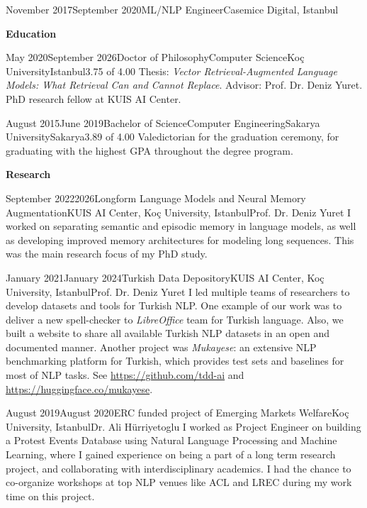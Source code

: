 \documentclass{cv}
\begin{document}
\begin{employment}{November 2017}{September 2020}{ML/NLP Engineer}{Casemice Digital, Istanbul}
\end{employment}
	

	\textbf{Education}\\
	\begin{education}{May 2020}{September 2026}{Doctor of Philosophy}{Computer Science}{Koç University}{Istanbul}{3.75 of 4.00}
	    Thesis: \textit{Vector Retrieval-Augmented Language Models: What Retrieval Can and Cannot Replace}. Advisor: Prof. Dr. Deniz Yuret. PhD research fellow at KUIS AI Center.
	\end{education}
	\vspace{0.1in}

	\begin{education}{August 2015}{June 2019}{Bachelor of Science}{Computer Engineering}{Sakarya University}{Sakarya}{3.89 of 4.00}
        Valedictorian for the graduation ceremony, for graduating with the highest GPA throughout the degree program.
	\end{education}
	
	\textbf{Research}\\
		\begin{research_exp}{September 2022}{2026}{Longform Language Models and Neural Memory Augmentation}{KUIS AI Center, Koç University, Istanbul}{Prof. Dr. Deniz Yuret}
            I worked on separating semantic and episodic memory in language models, as well as developing improved memory architectures for modeling long sequences. This was the main research focus of my PhD study.
	    \end{research_exp}
		\begin{research_exp}{January 2021}{January 2024}{Turkish Data Depository}{KUIS AI Center, Koç University, Istanbul}{Prof. Dr. Deniz Yuret}
            I led multiple teams of researchers to develop datasets and tools for Turkish NLP. One example of our work was to deliver a new spell-checker to \textit{LibreOffice} team for Turkish language. Also, we built a website to share all available Turkish NLP datasets in an open and documented manner. Another project was \textit{Mukayese}: an extensive NLP benchmarking platform for Turkish, which provides test sets and baselines for most of NLP tasks. See \url{https://github.com/tdd-ai} and \url{https://huggingface.co/mukayese}.
	    \end{research_exp}
        \begin{research_exp}{August 2019}{August 2020}{ERC funded project of Emerging Markets Welfare}{Koç University, Istanbul}{Dr. Ali Hürriyetoglu}
            I worked as Project Engineer on building a Protest Events Database using Natural Language Processing and Machine Learning, where I gained experience on being a part of a long term research project, and collaborating with interdisciplinary academics. I had the chance to co-organize workshops at top NLP venues like ACL and LREC during my work time on this project.
        \end{research_exp}
	
\end{document}
